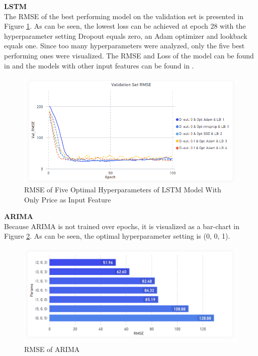 \documentclass[11pt, a4paper]{article}
\begin{document}
\noindent\textbf{LSTM}\\
The RMSE of the best performing model on the validation set is presented in Figure \ref{fig:lstm_price_rmse_best_params}. As can be seen, the lowest loss can be achieved
at epoch 28 with the hyperparameter setting Dropout equals zero, an Adam optimizer and lookback equals one. Since too many hyperparameters
were analyzed, only the five best performing ones were visualized. 
The RMSE and Loss of the model can be found in  and the models with other input features can be found in .
\begin{figure}[!h]
    \centering
    \includegraphics[width=\textwidth]{Only_Price_Params_RMSE_Validation_Set.png}
    \caption{RMSE of Five Optimal Hyperparameters of LSTM Model With Only Price as Input Feature}
    \label{fig:lstm_price_rmse_best_params}
\end{figure}

\noindent\textbf{ARIMA}\\
Because ARIMA is not trained over epochs, it is visualized as a bar-chart in Figure \ref{fig:arima_rmse}. As can be seen, the optimal hyperparameter setting is (0, 0, 1).

\begin{figure}[!h]
    \centering
    \includegraphics[width=\textwidth]{ARIMA_RMSE.png}
    \caption{RMSE of ARIMA}
    \label{fig:arima_rmse}
\end{figure}
\end{document}
